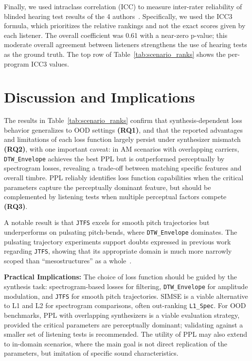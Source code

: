 \documentclass{article}
\newcommand{\anon}[1]{{#1}}
\newcommand{\LoneSpec}{\texttt{L1\_\allowbreak Spec}\xspace}
\newcommand{\JTFS}{\texttt{JTFS}\xspace}
\newcommand{\DTWEnv}{\texttt{DTW\_\allowbreak Envelope}\xspace}
\begin{document}
Finally, we used intraclass correlation (ICC) to measure inter-rater reliability of blinded hearing test results of the 4 authors~\cite{liljequist2019intraclass}. Specifically, we used the ICC3 formula, which prioritizes the relative rankings and not the exact scores given by each listener. The overall coefficient was 0.61 with a near-zero p-value; this moderate overall agreement between listeners strengthens the use of hearing tests as the ground truth. The top row of Table~\ref{tab:scenario_ranks} shows the per-program ICC3 values.

\section{Discussion and Implications}

The results in Table~\ref{tab:scenario_ranks} confirm that synthesis-dependent loss behavior generalizes to OOD settings \textbf{(RQ1)}, and that the reported advantages and limitations of each loss function largely persist under synthesizer mismatch \textbf{(RQ2)}, with one important caveat: in AM scenarios with overlapping carriers, \DTWEnv achieves the best PPL but is outperformed perceptually by spectrogram losses, revealing a trade-off between matching specific features and overall timbre. PPL reliably identifies loss function capabilities when the critical parameters capture the perceptually dominant feature, but should be complemented by listening tests when multiple perceptual factors compete \textbf{(RQ3)}.

A notable result is that \JTFS excels for smooth pitch trajectories but underperforms on pulsating pitch-bends, where \DTWEnv dominates. The pulsating trajectory experiments support doubts expressed in \anon{previous work}\cite{salimi2025evaluating} regarding \JTFS, showing that its appropriate domain is much more narrowly scoped than ``mesostructures'' as a whole~\cite{vahidi2023mesostructures}.

\noindent \textbf{Practical Implications:} The choice of loss function should be guided by the synthesis task: spectrogram-based losses for filtering, \DTWEnv for amplitude modulation, and \JTFS for smooth pitch trajectories. SIMSE is a viable alternative to L1 and L2 for spectrogram comparisons, often out-ranking \LoneSpec. For OOD benchmarks, PPL with overlapping synthesizers is a viable evaluation strategy, provided the critical parameters are perceptually dominant; validating against a smaller set of listening tests is recommended. The utility of PPL may also extend to in-domain scenarios, where the main goal is not direct replication of the parameters, but imitation of specific sound characteristics.
\end{document}
